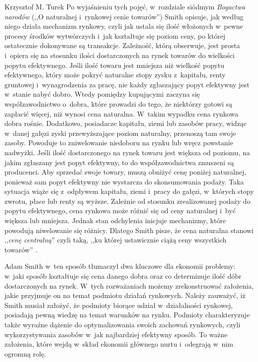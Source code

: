 \begin{artplenv}{Krzysztof M. Turek}
Po wyjaśnieniu tych pojęć, w~rozdziale siódmym \textit{Bogactwa narodów}
(,,O naturalnej i~rynkowej cenie towarów'') Smith opisuje, jak
według niego działa mechanizm rynkowy, czyli jak ustala się ilość włożonych w~pewne procesy środków wytwórczych i~jak
kształtuje się poziom ceny, po której ostatecznie dokonywane są transakcje. Zależność, którą obserwuje, jest
prosta i~opiera się na stosunku ilości dostarczonych na rynek towarów do wielkości popytu efektywnego. Jeśli ilość towaru jest
mniejsza niż wielkość popytu efektywnego, który może pokryć naturalne stopy zysku z~kapitału, renty
gruntowej i~wynagrodzenia za pracę, nie każdy zgłaszający popyt efektywny jest w~stanie nabyć dobro. Wtedy pomiędzy kupującymi
zaczyna się współzawodnictwo o~dobra, które prowadzi do tego, że niektórzy gotowi są zapłacić więcej, niż wynosi cena
naturalna. W~takim wypadku cena rynkowa dobra rośnie. Dodatkowo, posiadacze kapitału, ziemi lub zasobów pracy,
widząc w~danej gałęzi zyski przewyższające poziom naturalny, przenoszą tam swoje zasoby. Powoduje to zniwelowanie niedoboru na
rynku lub wręcz powstanie nadwyżki. Jeśli ilość dostarczonego na rynek towaru jest większa od poziomu, na jakim
zgłaszany jest popyt efektywny, to do współzawodnictwa zmuszeni są producenci. Aby sprzedać swoje towary, muszą obniżyć
cenę poniżej naturalnej, ponieważ sam popyt efektywny nie wystarcza do skonsumowania podaży. Taka sytuacja wiąże
się z~odpływem kapitału, ziemi i~pracy do gałęzi, w~których stopy zwrotu, płace lub renty są wyższe. Zależnie od stosunku
zrealizowanej podaży do popytu efektywnego, cena rynkowa może różnić się od ceny naturalnej i~być większa lub mniejsza.
Jednak stan odchylenia inicjuje mechanizmy, które powodują niwelowanie się różnicy. Dlatego Smith pisze, że cena
naturalna stanowi ,,\textit{cenę centralną}'' czyli taką, ,,ku której ustawicznie ciążą ceny wszystkich towarów''
\parencite[s.~70]{smith_badania_2007}.

Adam Smith w~ten sposób tłumaczył dwa kluczowe dla ekonomii problemy: w~jaki sposób kształtuje się cena danego dobra
oraz co determinuje ilość dóbr dostarczonych na rynek. W~tych rozważaniach możemy zrekonstruować założenia, jakie
przyjmuje on na temat podmiotu  działań rynkowych. Należy zauważyć, iż Smith musiał założyć, że podmioty
biorące udział w~działalności rynkowej,
posiadają pewną wiedzę na temat warunków na rynku. Podmioty charakteryzuje także wyraźne dążenie
do optymalizowania swoich zachowań rynkowych, czyli wykorzystywania zasobów w~jak najbardziej efektywny sposób. To
ważne założenia, które wejdą w~skład ekonomii głównego nurtu i~odegrają w~nim ogromną rolę.


\end{artplenv}
